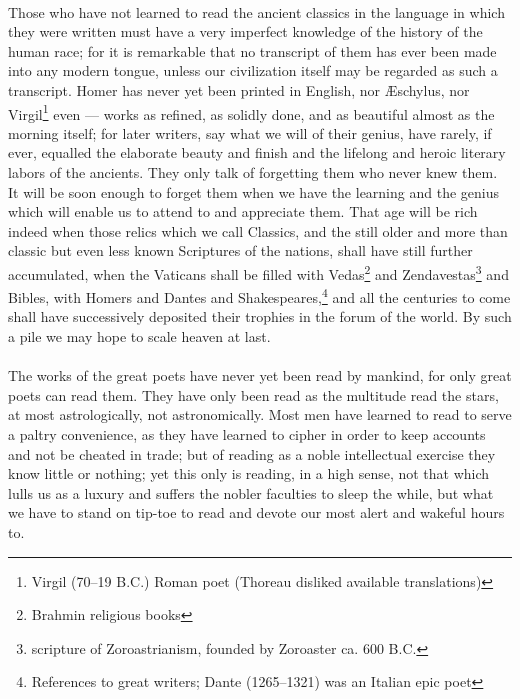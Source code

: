 \documentclass[letterpaper,12pt]{article}
\begin{document}
\paragraph{}
Those who have not learned to read the ancient classics in the language in which
they were written must have a very imperfect knowledge of the history of the
human race; for it is remarkable that no transcript of them has ever been made
into any modern tongue, unless our civilization itself may be regarded as such a
transcript. Homer has never yet been printed in English, nor \AE{}schylus, nor
Virgil\footnote{Virgil (70--19 B.C.) Roman poet (Thoreau disliked available
    translations)} even --- works as refined, as solidly done, and as beautiful
almost as the morning itself; for later writers, say what we will of their
genius, have rarely, if ever, equalled the elaborate beauty and finish and the
lifelong and heroic literary labors of the ancients. They only talk of
forgetting them who never knew them. It will be soon enough to forget them when
we have the learning and the genius which will enable us to attend to and
appreciate them. That age will be rich indeed when those relics which we call
Classics, and the still older and more than classic but even less known
Scriptures of the nations, shall have still further accumulated, when the
Vaticans shall be filled with Vedas\footnote{Brahmin religious books} and
Zendavestas\footnote{scripture of Zoroastrianism, founded by Zoroaster ca. 600
    B.C.} and Bibles, with Homers and Dantes and
Shakespeares,\footnote{References to great writers; Dante (1265--1321) was an
    Italian epic poet} and all the centuries to come shall have successively
deposited their trophies in the forum of the world. By such a pile we may hope
to scale heaven at last.

\paragraph{}
The works of the great poets have never yet been read by mankind, for only great
poets can read them. They have only been read as the multitude read the stars,
at most astrologically, not astronomically. Most men have learned to read to
serve a paltry convenience, as they have learned to cipher in order to keep
accounts and not be cheated in trade; but of reading as a noble intellectual
exercise they know little or nothing; yet this only is reading, in a high sense,
not that which lulls us as a luxury and suffers the nobler faculties to sleep
the while, but what we have to stand on tip-toe to read and devote our most
alert and wakeful hours to.
\end{document}
